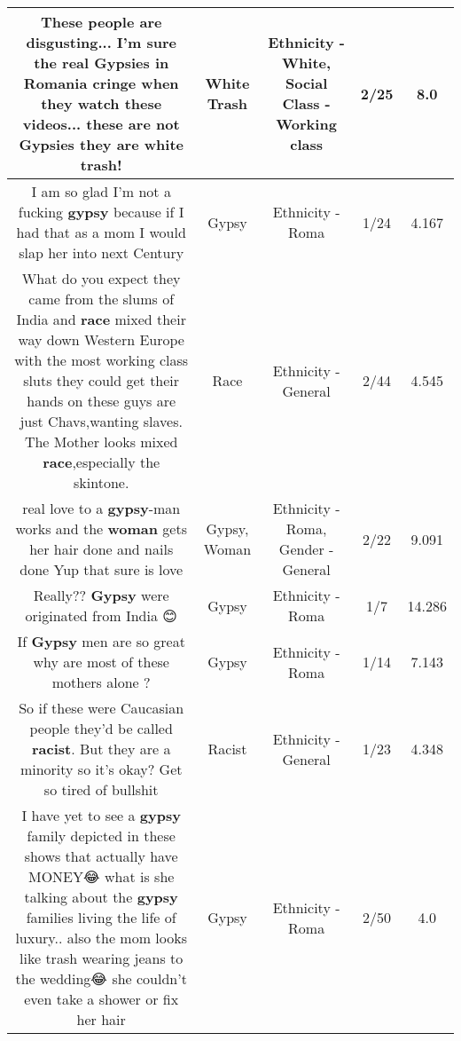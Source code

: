 \documentclass[11pt]{article}
\newlength\mylength
\begin{document}
\begin{center}
\begin{longtable}{|C{.65\mylength}|C{.30\mylength}|C{.12\mylength}|C{.12\mylength}|C{.12\mylength}|}
  \small These people are disgusting... I'm sure the real Gypsies in Romania cringe when they watch these videos... these are not Gypsies they are \textbf{w\textbf{hite trash}}!\normalsize   & White Trash & Ethnicity - White, Social Class - Working class & 2/25 & 8.0 \\  \hline
  \small I am so glad I'm not a fucking \textbf{gypsy} because if I had that as a mom I would slap her into next Century\normalsize   & Gypsy & Ethnicity - Roma & 1/24 & 4.167 \\  \hline
  \small What do you expect they came from the slums of India and \textbf{race} mixed their way down Western Europe with the most working class sluts they could get their hands on these guys are just Chavs,wanting slaves. The Mother looks mixed \textbf{race},especially the skintone.\normalsize   & Race & Ethnicity - General & 2/44 & 4.545 \\  \hline
  \small real love to a \textbf{gypsy}-man works and the \textbf{woman} gets her hair done and nails done Yup that sure is love\normalsize   & Gypsy, Woman & Ethnicity - Roma, Gender - General & 2/22 & 9.091 \\  \hline
  \small Really?? \textbf{Gypsy} were originated from India 😊\normalsize   & Gypsy & Ethnicity - Roma & 1/7 & 14.286 \\  \hline
  \small If \textbf{Gypsy} men are so great why are most of these mothers alone ?\normalsize   & Gypsy & Ethnicity - Roma & 1/14 & 7.143 \\  \hline
  \small So if these were Caucasian people they'd be called \textbf{racist}. But they are a minority so it's okay? Get so tired of bullshit\normalsize   & Racist & Ethnicity - General & 1/23 & 4.348 \\  \hline
  \small I have yet to see a \textbf{gypsy} family depicted in these shows that actually have MONEY😂 what is she talking about the \textbf{gypsy} families living the life of luxury.. also the mom looks like trash wearing jeans to the wedding😂 she couldn't even take a shower or fix her hair\normalsize   & Gypsy & Ethnicity - Roma & 2/50 & 4.0 \\  \hline

\end{longtable}
\end{center}
\end{document}
